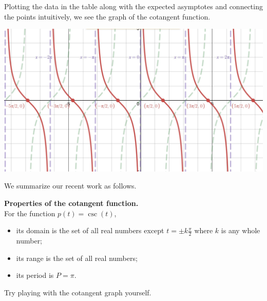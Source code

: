 \documentclass[nooutcomes, noauthor]{ximera}
\begin{document}
Plotting the data in the table along with the expected asymptotes and connecting the points intuitively, we see the graph of the cotangent function.

\begin{image}
\includegraphics[width=\textwidth]{cotangent.jpg}
\end{image}
We summarize our recent work as follows.

\begin{callout}
\textbf{Properties of the cotangent function.}\\
For the function \(p(t) = \csc(t)\),
\begin{itemize}[label=\textbullet]
\item
its domain is the set of all real numbers except \(t = \pm k\frac{\pi}{2}\) where \(k\) is any whole number;%
\item
its range is the set of all real numbers;
\item
its period is \(P = \pi\).%
\end{itemize}
\end{callout}

Try playing with the cotangent graph yourself.

\begin{center}  
\end{center} 
\end{document}
